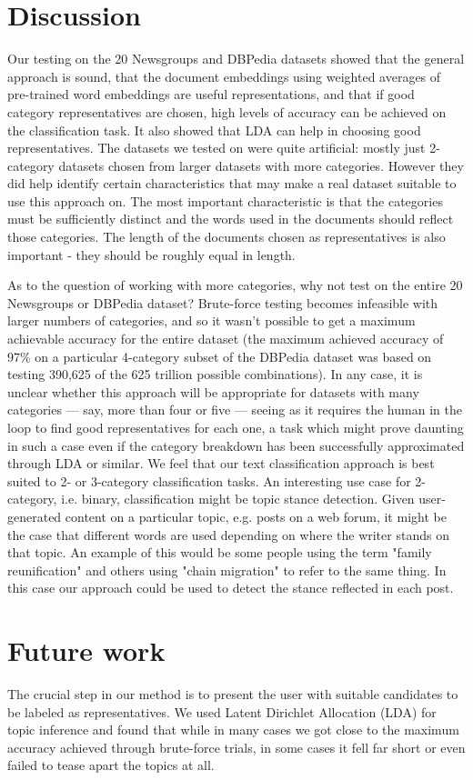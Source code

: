 \documentclass{article} %
\begin{document}
\section{Discussion}
Our testing on the 20 Newsgroups and DBPedia datasets showed that the general approach is sound, that the document embeddings using weighted averages of pre-trained word embeddings are useful representations, and that if good category representatives are chosen, high levels of accuracy can be achieved on the classification task. It also showed that LDA can help in choosing good representatives. The datasets we tested on were quite artificial: mostly just 2-category datasets chosen from larger datasets with more categories. However they did help identify certain characteristics that may make a real dataset suitable to use this approach on. The most important characteristic is that the categories must be sufficiently distinct and the words used in the documents should reflect those categories. The length of the documents chosen as representatives is also important - they should be roughly equal in length.

As to the question of working with more categories, why not test on the entire 20 Newsgroups or DBPedia dataset? Brute-force testing becomes infeasible with larger numbers of categories, and so it wasn't possible to get a maximum achievable accuracy for the entire dataset (the maximum achieved accuracy of 97\% on a particular 4-category subset of the DBPedia dataset was based on testing 390,625 of the 625 trillion possible combinations). In any case, it is unclear whether this approach will be appropriate for datasets with many categories --- say, more than four or five --- seeing as it requires the human in the loop to find good representatives for each one, a task which might prove daunting in such a case even if the category breakdown has been successfully approximated through LDA or similar. We feel that our text classification approach is best suited to 2- or 3-category classification tasks. An interesting use case for 2-category, i.e. binary, classification might be topic stance detection. Given user-generated content on a particular topic, e.g. posts on a web forum, it might be the case that different words are used depending on where the writer stands on that topic. An example of this would be some people using the term "family reunification" and others using "chain migration" to refer to the same thing. In this case our approach could be used to detect the stance reflected in each post.

\section{Future work}
The crucial step in our method is to present the user with suitable candidates to be labeled as representatives. We used Latent Dirichlet Allocation (LDA) for topic inference and found that while in many cases we got close to the maximum accuracy achieved through brute-force trials, in some cases it fell far short or even failed to tease apart the topics at all.
\end{document}

